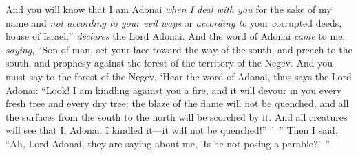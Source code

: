 \begin{biblechapter}
\verse And you will know that I am Adonai \textit{when I deal with you} for the sake of my name and \textit{not according to your evil ways} or \textit{according to} your corrupted deeds, house of Israel,” \textit{declares} the Lord Adonai.
\verse {} And the word of Adonai \textit{came} to me, \textit{saying},
\verse “Son of man, set your face toward the way of the south, and preach to the south, and prophesy against the forest of the territory of the Negev.
\verse And you must say to the forest of the Negev, ‘Hear the word of Adonai, thus says the Lord Adonai: “Look! I am kindling against you a fire, and it will devour in you every fresh tree and every dry tree; the blaze of the flame will not be quenched, and all the surfaces from the south to the north will be scorched by it.
\verse And all creatures will see that I, Adonai, I kindled it—it will not be quenched!” ’ ”
\verse Then I said, “Ah, Lord Adonai, they are saying about me, ‘Is he not posing a parable?’ ”
\end{biblechapter}

